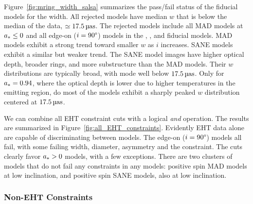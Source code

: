 Figure~\ref{fig:mring_width_salsa} summarizes the pass/fail status of the fiducial models for the \mring width.
All rejected models have median $w$ that is below the median of the data, $ \simeq 17.5\uas$.
The rejected models include all MAD models at $a_* \le 0$ and all edge-on ($i = 90\degree$) models in the \kharma, \bhac, and \hamr fiducial models.
MAD models exhibit a strong trend toward smaller $w$ as $i$ increases.
SANE models exhibit a similar but weaker trend.
The SANE model images have  higher optical depth, broader rings, and more substructure than the MAD models.
Their $w$ distributions are typically broad, with mode well below $17.5\uas$.
Only for $a_* = 0.94$, where the optical depth is lower due to higher temperatures in the emitting region, do most of the models exhibit a sharply peaked $w$ distribution centered at $17.5\uas$.


We can combine all EHT constraint cuts with a logical {\em and} operation.
The results are summarized in Figure~\ref{fig:all_EHT_constraints}.
Evidently EHT data alone are capable of discriminating between models.
The edge-on ($i = 90\degree$) models all fail, with some failing \mring width, diameter, asymmetry and the \vam  constraint.
The cuts clearly favor $a_* > 0$ models, with a few exceptions.
There are two clusters of models that do not fail any constraints in any models: positive spin MAD models at low inclination, and positive spin SANE models, also at low inclination.

\subsubsection{Non-EHT Constraints}

